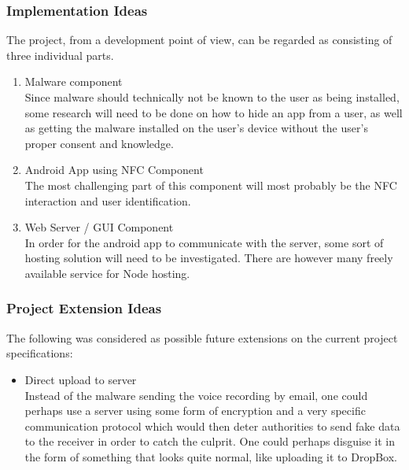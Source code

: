 \subsubsection{Implementation Ideas}
The project, from a development point of view, can be regarded as consisting of three individual parts.
\begin{enumerate}
	\item{Malware component}\\
Since malware should technically not be known to the user as being installed, some research will need to be done on how to hide an app from a user, as well as getting the malware installed on the user's device without the user's proper consent and knowledge.
	\item{Android App using NFC Component}\\
The most challenging part of this component will most probably be the NFC interaction and user identification.
	\item{Web Server / GUI Component}\\
In order for the android app to communicate with the server, some sort of hosting solution will need to be investigated. There are however many freely available service for Node hosting.
\end{enumerate}
	
\subsubsection{Project Extension Ideas}
The following was considered as possible future extensions on the current project specifications:

\begin{itemize}
	\item Direct upload to server\\
	Instead of the malware sending the voice recording by email, one could perhaps use a server using some form of encryption and a very specific communication protocol which would then deter authorities to send fake data to the receiver in order to catch the culprit. One could perhaps disguise it in the form of something that looks quite normal, like uploading it to DropBox.
	
\end{itemize}